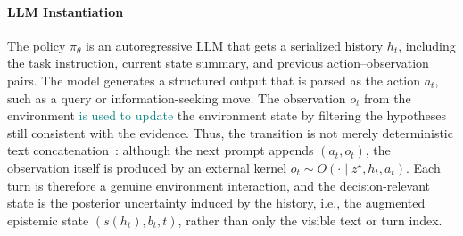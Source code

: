 \documentclass[11pt]{article}
\newcommand{\nk}[1]{\textcolor{teal}{#1}}
\theoremstyle{plain}
\theoremstyle{definition}
\theoremstyle{remark}
\begin{document}
\paragraph{LLM Instantiation}
The policy \(\pi_\theta\) is an autoregressive LLM that gets a serialized history \(h_t\), including the task instruction, current state summary, and previous action--observation pairs. The model generates a structured output that is parsed as the action \(a_t\), such as a query or information-seeking move. The observation \(o_t\) from the environment %
\nk{is used to update} the environment state by filtering the hypotheses still consistent with the evidence. Thus, the transition is not merely deterministic text concatenation~\citep{samineni2026rlonlyanalyzingstructural}: although the next prompt appends \((a_t,o_t)\), the observation itself is produced by an external kernel \(o_t\sim O(\cdot\mid z^\star,h_t,a_t)\). Each turn is therefore a genuine environment interaction, and the decision-relevant state is the posterior uncertainty induced by the history, i.e., the augmented epistemic state \((s(h_t),b_t,t)\), rather than only the visible text or turn index.

 
\vspace{-3mm}
\end{document}
